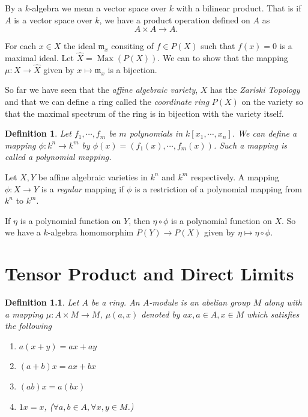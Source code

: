 \documentclass[]{report}
\newtheorem{defn}[theorem]{Definition}
\DeclareMathOperator\Max{Max}
\begin{document}
By a $k$-algebra we mean a vector space over $k$ with a bilinear product. That is if $A$ is a vector space over $k$, we have a product operation defined on $A$ as
    $$A \times A \rightarrow A.$$


    For each $x\in X$ the ideal $\mathfrak{m}_x$ consiting of $f\in P(X)$ such that $f(x) = 0$ is a maximal ideal. Let $\hat{X} = \Max(P(X))$. We can to show that the mapping $\mu: X \rightarrow \hat{X}$ given by $x\mapsto \mathfrak{m}_x$ is a bijection.

    So far we have seen that the \textit{affine algebraic variety}, $X$ has the \textit{Zariski Topology} and that we can define a ring called the \textit{coordinate ring} $P(X)$ on the variety so that the maximal spectrum of the ring is in bijection with the variety itself. 


\begin{defn}
    Let $f_1,\cdots, f_m$ be $m$ polynomials in $k[x_1,\cdots,x_n]$. We can define a mapping $\phi: k^n\rightarrow k^m$ by $\phi(x) = (f_1(x),\cdots,f_m(x))$. Such a mapping is called a \textit{polynomial mapping}.
\end{defn}


    Let $X,Y$ be affine algebraic varieties in $k^n$ and $k^m$ respectively. A mapping $\phi: X \rightarrow Y$ is a \textit{regular} mapping if $\phi$ is a restriction of a polynomial mapping from $k^n$ to $k^m$.

    If $\eta$ is a polynomial function on $Y$, then $\eta \circ \phi$ is a polynomial function on $X$. So we have a $k$-algebra homomorphim $P(Y) \rightarrow P(X)$ given by $\eta \mapsto \eta \circ \phi$.

\chapter{Tensor Product and Direct Limits}

\begin{defn}
    Let $A$ be a ring. An $A$-\textit{module} is an abelian group $M$ along with a mapping $\mu: A\times M\rightarrow M$, $\mu(a,x)$ denoted by $ax, a\in A, x\in M$ which satisfies the following
\begin{enumerate}
    \item $a(x+y) = ax + ay$
    \item $(a+b)x = ax + bx$
    \item $(ab)x = a(bx)$
    \item $1x = x$, 
 ($\forall a,b \in A, \forall x,y \in M$.)
\end{enumerate}
\end{defn}
\end{document}
